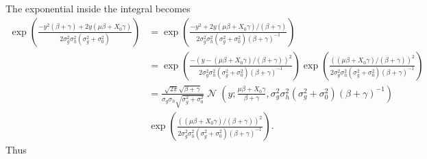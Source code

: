 \documentclass[a4paper]{amsart}
\DeclareMathOperator{\N}{\mathcal{N}}
\begin{document}
The exponential inside the integral becomes
\begin{align*}
\exp\left( \frac{-y^2(\beta + \gamma)+2y(\mu \beta + X_0\gamma)}{2\sigma_g^2\sigma_h^2(\sigma_g^2 + \sigma_0^2)}\right) &= \exp\left( \frac{-y^2+2y(\mu \beta + X_0\gamma)/(\beta + \gamma)}{2\sigma_g^2\sigma_h^2(\sigma_g^2 + \sigma_0^2)(\beta + \gamma)^{-1}}\right)\\
&= \exp\left( \frac{-\left(y - (\mu \beta + X_0\gamma)/(\beta + \gamma)\right)^2}{2\sigma_g^2\sigma_h^2(\sigma_g^2 + \sigma_0^2)(\beta + \gamma)^{-1}}\right)\exp\left( \frac{\left((\mu \beta + X_0\gamma)/(\beta + \gamma)\right)^2}{2\sigma_g^2\sigma_h^2(\sigma_g^2 + \sigma_0^2)(\beta + \gamma)^{-1}}\right)\\
&= \frac{\sqrt{2\pi}\sqrt{\beta + \gamma}}{\sigma_g\sigma_h\sqrt{\sigma_g^2 + \sigma_0^2}}\N\left(y; \frac{\mu \beta + X_0\gamma}{\beta + \gamma}, \sigma_g^2\sigma_h^2(\sigma_g^2 + \sigma_0^2)(\beta + \gamma)^{-1}\right)\\
&\exp\left( \frac{\left((\mu \beta + X_0\gamma)/(\beta + \gamma)\right)^2}{2\sigma_g^2\sigma_h^2(\sigma_g^2 + \sigma_0^2)(\beta + \gamma)^{-1}}\right).
\end{align*}
Thus
\end{document}
